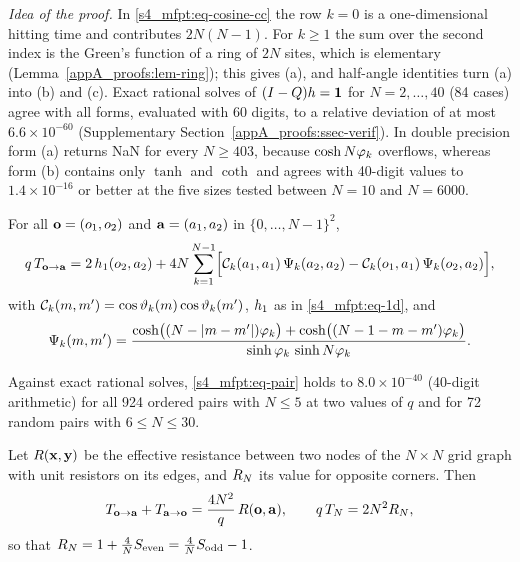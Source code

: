 \emph{Idea of the proof.} In \eqref{s4_mfpt:eq-cosine-cc} the row $k=0$ is a one-dimensional hitting time and
contributes $2N(N-1)$. For $k\ge1$ the sum over the second index is the Green's function of a ring of $2N$ sites,
which is elementary (Lemma~\ref{appA_proofs:lem-ring}); this gives (a), and half-angle identities turn (a) into (b) and
(c). Exact rational solves of $(I-Q)h=\mathbf{1}$ for $N=2,\dots,40$ (84 cases) agree with all forms, evaluated with
60 digits, to a relative deviation of at most $6.6\times10^{-60}$ (Supplementary Section~\ref{appA_proofs:ssec-verif}).
In double precision form (a) returns NaN for every $N\ge403$, because $\cosh N\varphi_{k}$ overflows, whereas form (b)
contains only $\tanh$ and $\coth$ and agrees with 40-digit values to $1.4\times10^{-16}$ or better at the five sizes tested between $N=10$ and
$N=6000$.

\begin{theorem}[Single sum for an arbitrary start and target, $\dd=2$]\label{s4_mfpt:thm-pair}
For all $\mathbf{o}=(o_1,o_2)$ and $\mathbf{a}=(a_1,a_2)$ in $\{0,\dots,N-1\}^{2}$,
\begin{equation}\label{s4_mfpt:eq-pair}
  q\,T_{\mathbf{o}\to\mathbf{a}}=2\,h_{1}(o_2,a_2)+4N\sum_{k=1}^{N-1}
  \Bigl[\mathcal C_k(a_1,a_1)\,\Psi_k(a_2,a_2)-\mathcal C_k(o_1,a_1)\,\Psi_k(o_2,a_2)\Bigr],
\end{equation}
with $\mathcal C_k(m,m')=\cos\vartheta_{k}(m)\cos\vartheta_{k}(m')$, $h_{1}$ as in \eqref{s4_mfpt:eq-1d}, and
\begin{equation}\label{s4_mfpt:eq-Psi}
  \Psi_k(m,m')=\frac{\cosh\bigl((N-|m-m'|)\varphi_{k}\bigr)+\cosh\bigl((N-1-m-m')\varphi_{k}\bigr)}
                    {\sinh\varphi_{k}\,\sinh N\varphi_{k}} .
\end{equation}
\end{theorem}

Against exact rational solves, \eqref{s4_mfpt:eq-pair} holds to $8.0\times10^{-40}$ (40-digit arithmetic) for all
924 ordered pairs with $N\le5$ at two values of $q$ and for 72 random pairs with $6\le N\le30$.

\begin{corollary}\label{s4_mfpt:cor-resistance}
Let $R(\mathbf{x},\mathbf{y})$ be the effective resistance between two nodes of the $N\times N$ grid graph with unit
resistors on its edges, and $R_N$ its value for opposite corners. Then
\begin{equation}\label{s4_mfpt:eq-resistance}
  T_{\mathbf{o}\to\mathbf{a}}+T_{\mathbf{a}\to\mathbf{o}}=\frac{4N^{2}}{q}\,R(\mathbf{o},\mathbf{a}),\qquad q\,T_{N}=2N^{2}R_N ,
\end{equation}
so that $R_N=1+\frac4N S_{\mathrm{even}}=\frac4N S_{\mathrm{odd}}-1$.
\end{corollary}

